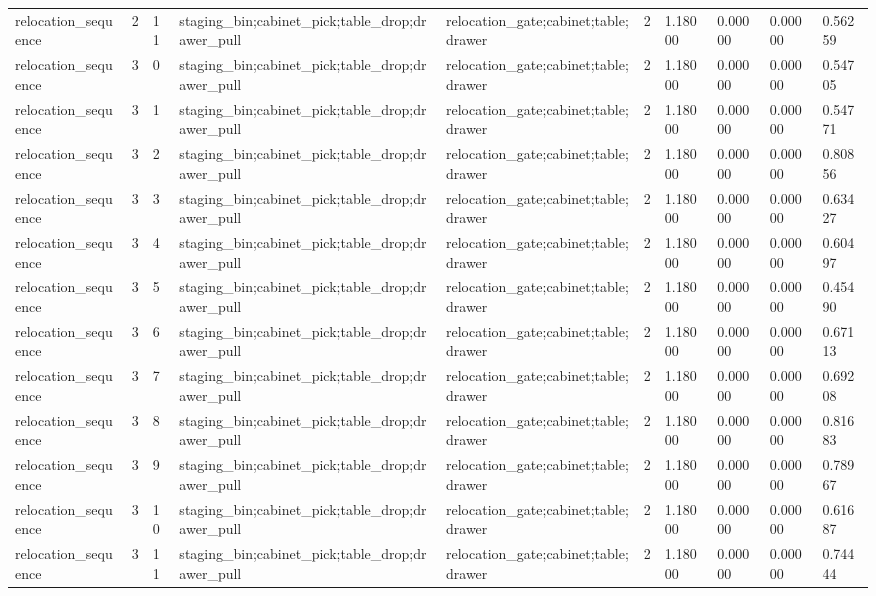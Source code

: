 \documentclass{article}
\begin{document}
\begin{table}[tbp]
{\begin{tabular}{llllllllll}
relocation\_sequence & 2 & 11 & staging\_bin;cabinet\_pick;table\_drop;drawer\_pull & relocation\_gate;cabinet;table;drawer & 2 & 1.18000 & 0.00000 & 0.00000 & 0.56259 \\
relocation\_sequence & 3 & 0 & staging\_bin;cabinet\_pick;table\_drop;drawer\_pull & relocation\_gate;cabinet;table;drawer & 2 & 1.18000 & 0.00000 & 0.00000 & 0.54705 \\
relocation\_sequence & 3 & 1 & staging\_bin;cabinet\_pick;table\_drop;drawer\_pull & relocation\_gate;cabinet;table;drawer & 2 & 1.18000 & 0.00000 & 0.00000 & 0.54771 \\
relocation\_sequence & 3 & 2 & staging\_bin;cabinet\_pick;table\_drop;drawer\_pull & relocation\_gate;cabinet;table;drawer & 2 & 1.18000 & 0.00000 & 0.00000 & 0.80856 \\
relocation\_sequence & 3 & 3 & staging\_bin;cabinet\_pick;table\_drop;drawer\_pull & relocation\_gate;cabinet;table;drawer & 2 & 1.18000 & 0.00000 & 0.00000 & 0.63427 \\
relocation\_sequence & 3 & 4 & staging\_bin;cabinet\_pick;table\_drop;drawer\_pull & relocation\_gate;cabinet;table;drawer & 2 & 1.18000 & 0.00000 & 0.00000 & 0.60497 \\
relocation\_sequence & 3 & 5 & staging\_bin;cabinet\_pick;table\_drop;drawer\_pull & relocation\_gate;cabinet;table;drawer & 2 & 1.18000 & 0.00000 & 0.00000 & 0.45490 \\
relocation\_sequence & 3 & 6 & staging\_bin;cabinet\_pick;table\_drop;drawer\_pull & relocation\_gate;cabinet;table;drawer & 2 & 1.18000 & 0.00000 & 0.00000 & 0.67113 \\
relocation\_sequence & 3 & 7 & staging\_bin;cabinet\_pick;table\_drop;drawer\_pull & relocation\_gate;cabinet;table;drawer & 2 & 1.18000 & 0.00000 & 0.00000 & 0.69208 \\
relocation\_sequence & 3 & 8 & staging\_bin;cabinet\_pick;table\_drop;drawer\_pull & relocation\_gate;cabinet;table;drawer & 2 & 1.18000 & 0.00000 & 0.00000 & 0.81683 \\
relocation\_sequence & 3 & 9 & staging\_bin;cabinet\_pick;table\_drop;drawer\_pull & relocation\_gate;cabinet;table;drawer & 2 & 1.18000 & 0.00000 & 0.00000 & 0.78967 \\
relocation\_sequence & 3 & 10 & staging\_bin;cabinet\_pick;table\_drop;drawer\_pull & relocation\_gate;cabinet;table;drawer & 2 & 1.18000 & 0.00000 & 0.00000 & 0.61687 \\
relocation\_sequence & 3 & 11 & staging\_bin;cabinet\_pick;table\_drop;drawer\_pull & relocation\_gate;cabinet;table;drawer & 2 & 1.18000 & 0.00000 & 0.00000 & 0.74444 \\

\end{tabular}}
\end{table}
\end{document}
